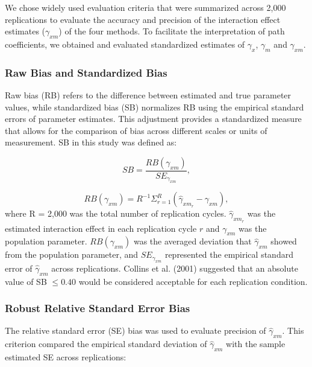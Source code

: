 \documentclass[
  man,mask]{apa6}
\begin{document}
We chose widely used evaluation criteria that were summarized across 2,000 replications to evaluate the accuracy and precision of the interaction effect estimates (\(\gamma_{xm}\)) of the four methods. To facilitate the interpretation of path coefficients, we obtained and evaluated standardized estimates of \(\gamma_{x}\), \(\gamma_{m}\) and \(\gamma_{xm}\).

\subsubsection{Raw Bias and Standardized Bias}\label{raw-bias-and-standardized-bias}

Raw bias (RB) refers to the difference between estimated and true parameter values, while standardized bias (SB) normalizes RB using the empirical standard errors of parameter estimates. This adjustment provides a standardized measure that allows for the comparison of bias across different scales or units of measurement. SB in this study was defined as:

\begin{equation}
SB = \frac{RB(\gamma_{xm})}{SE_{\gamma_{xm}}},
\end{equation}

\begin{equation}
RB(\gamma_{xm}) = R^{-1}\Sigma^{R}_{r = 1}(\hat{\gamma}_{xm_{r}} - \gamma_{xm}),
\end{equation}
where R = 2,000 was the total number of replication cycles. \(\hat{\gamma}_{xm_{r}}\) was the estimated interaction effect in each replication cycle \(r\) and \(\gamma_{xm}\) was the population parameter. \(RB(\gamma_{xm})\) was the averaged deviation that \(\hat{\gamma}_{xm}\) showed from the population parameter, and \(SE_{\gamma_{xm}}\) represented the empirical standard error of \(\hat{\gamma}_{xm}\) across replications. Collins et al. (2001) suggested that an absolute value of SB \(\le 0.40\) would be considered acceptable for each replication condition.

\subsubsection{Robust Relative Standard Error Bias}\label{robust-relative-standard-error-bias}

The relative standard error (SE) bias was used to evaluate precision of \(\hat{\gamma}_{xm}\). This criterion compared the empirical standard deviation of \(\hat{\gamma}_{xm}\) with the sample estimated SE across replications:
\end{document}
